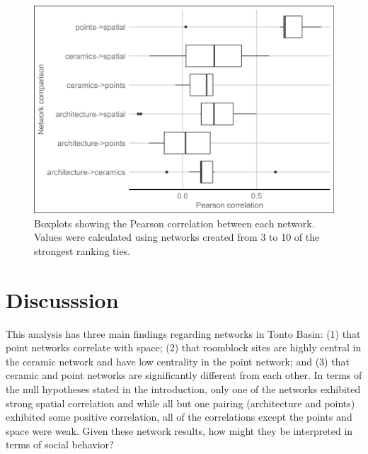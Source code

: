\documentclass[]{interact}
\theoremstyle{plain}%
\theoremstyle{definition}
\theoremstyle{remark}
\begin{document}
\begin{figure}
\includegraphics[width=1\linewidth]{figures/TontoNetworksCorrelation} \caption{Boxplots showing the Pearson correlation between each network. Values were calculated using networks created from 3 to 10 of the strongest ranking ties.}\label{fig:TontoNetworksCorrelation}
\end{figure}

\hypertarget{discusssion}{%
\section*{Discusssion}\label{discusssion}}

This analysis has three main findings regarding networks in Tonto Basin:
(1) that point networks correlate with space; (2) that roomblock sites
are highly central in the ceramic network and have low centrality in the
point network; and (3) that ceramic and point networks are significantly
different from each other. In terms of the null hypotheses stated in the
introduction, only one of the networks exhibited strong spatial
correlation and while all but one pairing (architecture and points)
exhibited some positive correlation, all of the correlations except the
points and space were weak. Given these network results, how might they
be interpreted in terms of social behavior?
\end{document}
